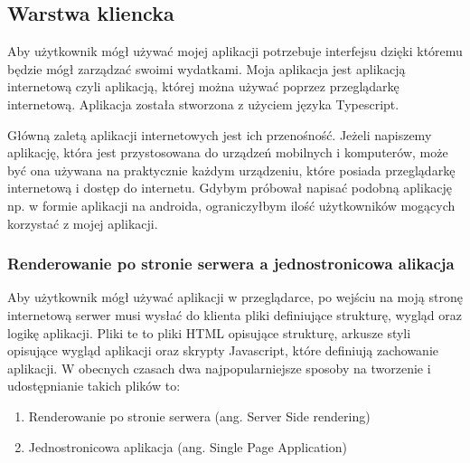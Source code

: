\subsection{Warstwa kliencka}
Aby użytkownik mógł używać mojej aplikacji potrzebuje interfejsu dzięki któremu będzie mógł zarządzać swoimi wydatkami. Moja aplikacja jest aplikacją internetową czyli aplikacją, której można używać poprzez przeglądarkę internetową. Aplikacja została stworzona z użyciem języka Typescript.

Główną zaletą aplikacji internetowych jest ich przenośność. Jeżeli napiszemy aplikację, która jest przystosowana do urządzeń mobilnych i komputerów, może być ona używana na praktycznie każdym urządzeniu, które posiada przeglądarkę internetową i dostęp do internetu. Gdybym próbował napisać podobną aplikację np. w formie aplikacji na androida, ograniczyłbym ilość użytkowników mogących korzystać z mojej aplikacji.
\subsubsection{Renderowanie po stronie serwera a jednostronicowa alikacja}
Aby użytkownik mógł używać aplikacji w przeglądarce, po wejściu na moją stronę internetową serwer musi wysłać do klienta pliki definiujące strukturę, wygląd oraz logikę aplikacji. Pliki te to pliki HTML opisujące strukturę, arkusze styli opisujące wygląd aplikacji oraz skrypty Javascript, które definiują zachowanie aplikacji.
W obecnych czasach dwa najpopularniejsze sposoby na tworzenie i udostępnianie takich plików to:
\begin{enumerate}
  \item Renderowanie po stronie serwera (ang. Server Side rendering)
  \item Jednostronicowa aplikacja (ang. Single Page Application)
\end{enumerate}

